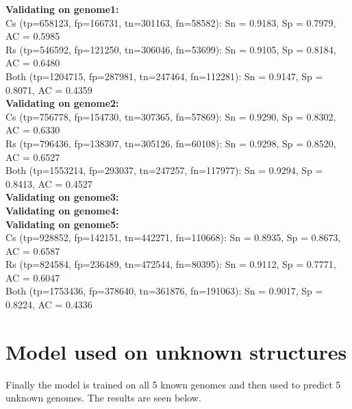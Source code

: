 \documentclass[paper=a4, fontsize=11pt]{scrartcl} %
\numberwithin{equation}{section} %
\numberwithin{figure}{section} %
\numberwithin{table}{section} %
\begin{document}
\textbf{Validating on genome1:} \\
Cs   (tp=658123, fp=166731, tn=301163, fn=58582): Sn = 0.9183, Sp = 0.7979, AC = 0.5985 \\
Rs   (tp=546592, fp=121250, tn=306046, fn=53699): Sn = 0.9105, Sp = 0.8184, AC = 0.6480 \\
Both (tp=1204715, fp=287981, tn=247464, fn=112281): Sn = 0.9147, Sp = 0.8071, AC = 0.4359 \\

\textbf{Validating on genome2:} \\
Cs   (tp=756778, fp=154730, tn=307365, fn=57869): Sn = 0.9290, Sp = 0.8302, AC = 0.6330 \\
Rs   (tp=796436, fp=138307, tn=305126, fn=60108): Sn = 0.9298, Sp = 0.8520, AC = 0.6527 \\
Both (tp=1553214, fp=293037, tn=247257, fn=117977): Sn = 0.9294, Sp = 0.8413, AC = 0.4527 \\


\textbf{Validating on genome3:} \\


\textbf{Validating on genome4:} \\


\textbf{Validating on genome5:} \\
Cs   (tp=928852, fp=142151, tn=442271, fn=110668): Sn = 0.8935, Sp = 0.8673, AC = 0.6587 \\
Rs   (tp=824584, fp=236489, tn=472544, fn=80395): Sn = 0.9112, Sp = 0.7771, AC = 0.6047 \\
Both (tp=1753436, fp=378640, tn=361876, fn=191063): Sn = 0.9017, Sp = 0.8224, AC = 0.4336 \\

\section{Model used on unknown structures}
Finally the model is trained on all 5 known genomes and then used to predict 5 unknown genomes. The results are seen below. 


\end{document}
